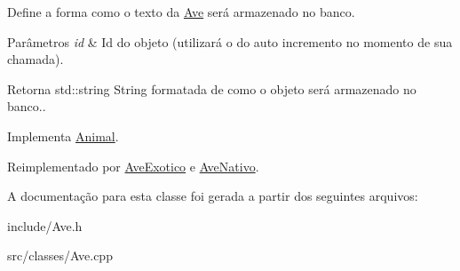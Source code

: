 Define a forma como o texto da \hyperlink{classAve}{Ave} será armazenado no banco. 


\begin{DoxyParams}{Parâmetros}
{\em id} & Id do objeto (utilizará o do auto incremento no momento de sua chamada). \\
\hline
\end{DoxyParams}
\begin{DoxyReturn}{Retorna}
std\+::string String formatada de como o objeto será armazenado no banco.. 
\end{DoxyReturn}


Implementa \hyperlink{classAnimal_ac75406040726a6339932d70164cc7242}{Animal}.



Reimplementado por \hyperlink{classAveExotico_a4ba81def12131f047b3800e5f10a983b}{Ave\+Exotico} e \hyperlink{classAveNativo_ab95679ed20354b2183706db24899d316}{Ave\+Nativo}.



A documentação para esta classe foi gerada a partir dos seguintes arquivos\+:\begin{DoxyCompactItemize}
\item 
include/Ave.\+h\item 
src/classes/Ave.\+cpp\end{DoxyCompactItemize}
